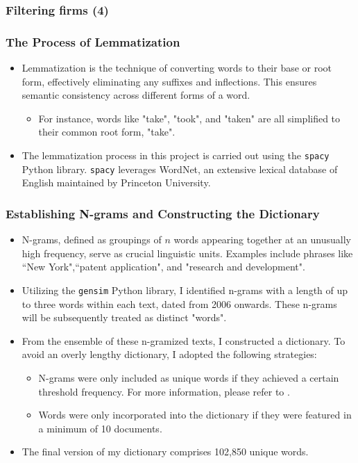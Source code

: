 \documentclass{beamer}
\newcommand{\ffo}{dicfullmc10thr10defnob5noa0_8_4t}
\begin{document}
\begin{frame}
\frametitle{Filtering firms (4)}
\scriptsize


\end{frame}


\begin{frame}
\frametitle{The Process of Lemmatization}
\begin{itemize}
\item Lemmatization is the technique of converting words to their base or root form, effectively eliminating any suffixes and inflections. This ensures semantic consistency across different forms of a word.
\begin{itemize}
  \item For instance, words like "take", "took", and "taken" are all simplified to their common root form, "take".
\end{itemize}
\item The lemmatization process in this project is carried out using the \texttt{spacy} Python library. \texttt{spacy} leverages WordNet, an extensive lexical database of English maintained by Princeton University. 
\end{itemize}
\end{frame}

\begin{frame}
\frametitle{Establishing N-grams and Constructing the Dictionary}
\label{ngram_main}
\small	
\begin{itemize}
\item N-grams, defined as groupings of $n$ words appearing together at an unusually high frequency, serve as crucial linguistic units. Examples include phrases like ``New York",``patent application", and "research and development".
\item Utilizing the \texttt{gensim} Python library, I identified n-grams with a length of up to three words within each text, dated from 2006 onwards. These n-grams will be subsequently treated as distinct "words".
\item From the ensemble of these n-gramized texts, I constructed a dictionary. To avoid an overly lengthy dictionary, I adopted the following strategies:
\begin{itemize}
  \item N-grams were only included as unique words if they achieved a certain threshold frequency. For more information, please refer to \hyperlink{ngram_details}{}.
  \item Words were only incorporated into the dictionary if they were featured in a minimum of 10 documents.
\end{itemize}
\item The final version of my dictionary comprises 102,850 unique words.
\end{itemize}
\normalsize
\end{frame}
\end{document}
